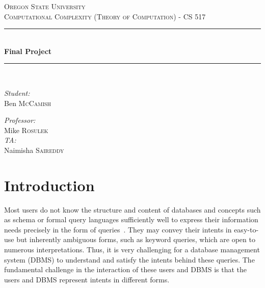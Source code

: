 \documentclass{article}
\newcommand{\HRule}{\rule{\linewidth}{0.5mm}}
\begin{document}
\begin{titlepage}
\begin{center}

\textsc{\LARGE Oregon State University}\\[1.5cm]

\textsc{\Large Computational Complexity (Theory of Computation) - CS 517}\\[0.5cm]

\HRule \\[0.4cm]
{ \huge \bfseries Final Project\\[0.4cm] }

\HRule \\[1.5cm]

\noindent
\begin{minipage}{0.4\textwidth}
\begin{flushleft} \large
\emph{Student:}\\
Ben \textsc{McCamish}
\end{flushleft}
\end{minipage}%
\begin{minipage}{0.4\textwidth}
\begin{flushright} \large
\emph{Professor:} \\
Mike \textsc{Rosulek}\\
\emph{TA:} \\
Naimisha \textsc{Saireddy}
\end{flushright}
\end{minipage}

\vfill


\end{center}
\end{titlepage}

\section{Introduction}
Most users do not know the structure and content of databases and concepts such as schema or formal query languages sufficiently well to express their information needs precisely in the form of queries~\cite{Usable:Jagadish,Chen:2009:KSS,Idreos:SIGMOD:2015}. They may convey their intents in easy-to-use but inherently ambiguous forms, such as keyword queries, which are open to numerous interpretations. Thus, it is very challenging for a database management system (DBMS) to understand and satisfy the intents behind these queries. The fundamental challenge in the interaction of these users and DBMS is that the users and DBMS represent intents in different forms.
\end{document}
